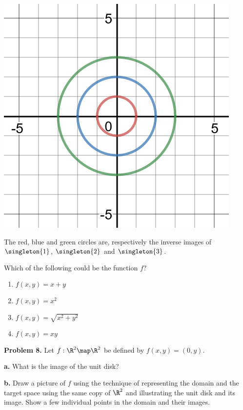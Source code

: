 \documentclass[oneside,12pt]{amsart}
\begin{document}
\includegraphics[scale=0.2]{circles}

The red, blue and green circles are, respectively the inverse
images of $\singleton{1}$, $\singleton{2}$ and $\singleton{3}$.

Which of the following could be the function $f$?

\begin{enumerate}
\item $f(x,y) = x + y$
\item $f(x, y) = x^2$
\item $f(x,y) = \sqrt{x^2 + y^2}$
\item $f(x,y) = xy$
\end{enumerate}

\bigskip

\textbf{Problem 8.} Let $f:\R^2 \map \R^2$ be defined by $f(x,y) = (0, y)$.

\smallskip

\textbf{a.} What is the image of the unit disk?

\bigskip

\textbf{b.} Draw a picture of $f$ using the technique of representing the
domain and the target space using the same copy of $\R^2$ and illustrating
the unit disk and its image. Show a few individual points in the domain and
their images.
\end{document}
